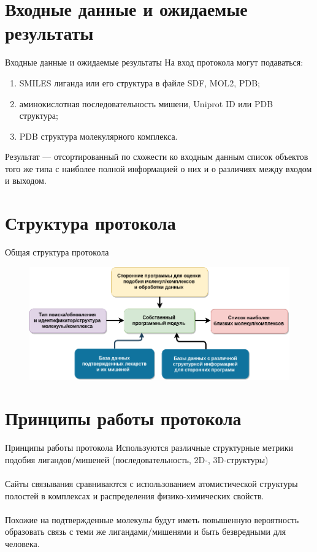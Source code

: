 \documentclass[14pt]{beamer}
\begin{document}
\section{Входные данные и ожидаемые результаты}
\begin{frame}{Входные данные и ожидаемые результаты}
На вход протокола могут подаваться:
\begin{enumerate}
	\item SMILES лиганда или его структура в файле SDF, MOL2, PDB;
	\item аминокислотная последовательность мишени, Uniprot ID или PDB структура;
	\item PDB структура молекулярного комплекса.
\end{enumerate}

Результат --- отсортированный по схожести ко входным данным список объектов того же типа с наиболее полной информацией о них и о различиях между входом и выходом.
\end{frame}
\section{Структура протокола}
\begin{frame}{Общая структура протокола}
\begin{figure}
	\centering
	\includegraphics[width=120mm]{../Drawio/6}
\end{figure}
\end{frame}
\section{Принципы работы протокола}
\begin{frame}{Принципы работы протокола}
	Используются различные структурные метрики подобия лигандов/мишеней (последовательность, 2D-, 3D-структуры)\\
	$\:$\\
	Сайты связывания сравниваются с использованием атомистической структуры полостей в комплексах и распределения физико-химических свойств.\\
	$\:$\\
	Похожие на подтвержденные молекулы будут иметь повышенную вероятность образовать связь с теми же лигандами/мишенями и быть безвредными для человека.
	
\end{frame}
\end{document}
